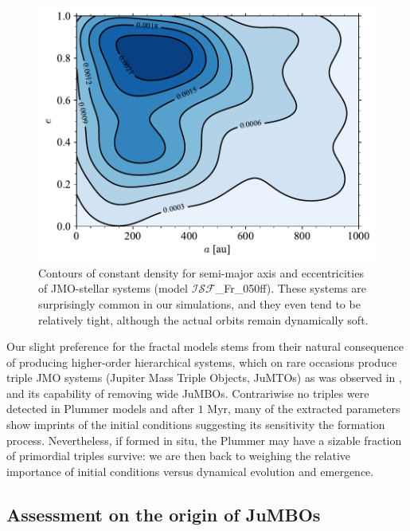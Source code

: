 \documentclass[submission,phys]{lib/SciPost}
\newcommand{\jumbos}{\mbox{JuMBOs}}
\begin{document}
   \begin{figure}
    \centering
    \includegraphics[width=0.75\columnwidth]{figures/Fractal_rvir0.5_FF_sem_ecc_mixed_systs.pdf}
    \caption{Contours of constant density for semi-major axis and
      eccentricities of JMO-stellar systems (model
      $\mathcal{ISF}$\_Fr\_050ff). These systems are surprisingly common in
      our simulations, and they even tend to be relatively tight, although the actual 
      orbits remain dynamically soft. }
         \label{Fig:MixedSys_OrbParams}
   \end{figure}

Our slight preference for the fractal models stems from their natural
consequence of producing higher-order hierarchical systems, which on
rare occasions produce triple JMO systems (Jupiter Mass Triple
Objects, JuMTOs) as was observed in \cite{2023arXiv231001231P}, and
its capability of removing wide \jumbos.  Contrariwise no triples were
detected in Plummer models and after $1$ Myr, many of the extracted
parameters show imprints of the initial conditions suggesting its
sensitivity the formation process.  Nevertheless, if formed in situ,
the Plummer may have a sizable fraction of primordial triples survive:
we are then back to weighing the relative importance of initial
conditions versus dynamical evolution and emergence.



\subsection{Assessment on the origin of \jumbos}
\end{document}
